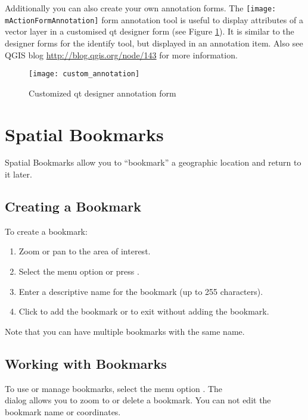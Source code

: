 Additionally you can also create your own annotation forms. The
\texttt{[image: mActionFormAnnotation]} form annotation
tool is useful to display attributes of a vector layer in a customised qt
designer form (see Figure \ref{fig:custom-annotations}). It is similar to the
designer forms for the identify tool, but displayed in an annotation item.
Also see QGIS blog \url{http://blog.qgis.org/node/143} for more information.

\begin{figure}[ht]
   \centering
   \texttt{[image: custom\_annotation]}
   \caption{Customized qt designer annotation form \nixcaption}
   \label{fig:custom-annotations}
\end{figure}

\newpage

\section{Spatial Bookmarks}\label{sec:bookmarks}

Spatial Bookmarks allow you to ``bookmark'' a geographic location and return to it later.

\subsection{Creating a Bookmark}
To create a bookmark:
\begin{enumerate}
\item Zoom or pan to the area of interest.
\item Select the menu option  \arrow {} or press .
\item Enter a descriptive name for the bookmark (up to 255 characters).
\item Click  to add the bookmark or  to exit without adding the bookmark.
\end{enumerate}

Note that you can have multiple bookmarks with the same name.

\subsection{Working with Bookmarks}
To use or manage bookmarks, select the menu
option  \arrow {}. The \\
 dialog allows you to zoom to or delete a bookmark.
You can not edit the bookmark name or coordinates.

